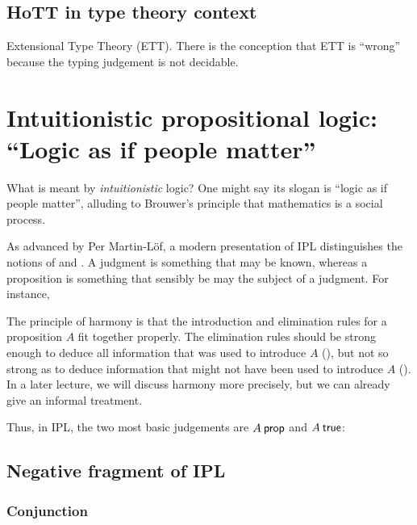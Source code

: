 \documentclass[12pt]{article}
\begin{document}
\subsection{HoTT in type theory context}\label{subsec:type_theory_context}

Extensional Type Theory (ETT).  There is the conception that ETT is ``wrong''~\cite{Harper2012}
because the typing judgement is not decidable.

\section{Intuitionistic propositional logic: ``Logic as if people matter''}\label{sec:ipl}


What is meant by \emph{intuitionistic} logic?  One might say its slogan is ``logic as if people matter'', alluding to Brouwer's principle that mathematics is a social process.

%
%
As advanced by Per Martin-L\"{o}f, a modern presentation of \gls{IPL} distinguishes the notions of  and .
A judgment is something that may be known, whereas a proposition is something that sensibly be may the subject of a judgment.
For instance, 

The principle of harmony is that the introduction and elimination rules for a proposition $A$ fit together properly.  The elimination rules should be strong enough to deduce all information that was used to introduce $A$ (), but not so strong as to deduce information that might not have been used to introduce $A$ ().  In a later lecture, we will discuss harmony more precisely, but we can already give an informal treatment.


Thus, in \gls{IPL}, the two most basic judgements are $A \prop$ and $A \true$:


\subsection{Negative fragment of \gls{IPL}}\label{sec:ipl-negative}

\subsubsection{Conjunction}\label{sec:conjunction}
\end{document}
